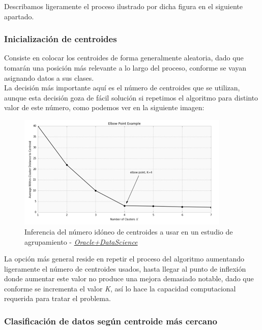 \documentclass[]{report}
\begin{document}
				Describamos ligeramente el proceso ilustrado por dicha figura en el siguiente apartado.
				
				\subsubsection{Inicialización de centroides}
				
					Consiste en colocar los centroides de forma generalmente aleatoria, dado que tomarán una posición más relevante a lo largo del proceso, conforme se vayan asignando datos a sus clases.\\
					
					La decisión más importante aquí es el número de centroides que se utilizan, aunque esta decisión goza de fácil solución si repetimos el algoritmo para distinto valor de este número, como podemos ver en la siguiente imagen:
					
					\begin{figure}[h!]
						\centering
						\includegraphics[width=0.9\textwidth]{k-means-oracle.png}
						\caption{Inferencia del número idóneo de centroides a usar en un estudio de agrupamiento - \href{https://www.datascience.com/blog/k-means-clustering}{\textit{Oracle+DataScience}}}
						\label{k-means-elbow-point}
					\end{figure}
					
					La opción más general reside en repetir el proceso del algoritmo aumentando ligeramente el número de centroides usados, hasta llegar al punto de inflexión donde aumentar este valor no produce una mejora demasiado notable, dado que conforme se incrementa el valor \textit{K}, así lo hace la capacidad computacional requerida para tratar el problema.
					
				\subsubsection{Clasificación de datos según centroide más cercano}
				
\end{document}
